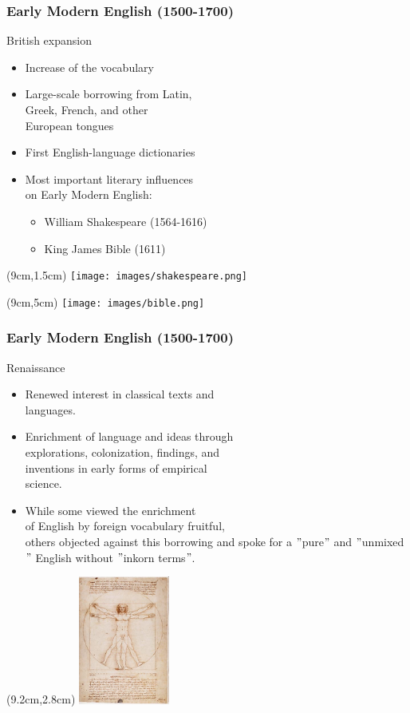 \documentclass[12pt, table]{beamer}
\begin{document}
\begin{frame}
\frametitle{Early Modern English (1500-1700)}
British expansion
\begin{itemize}
\item Increase of the vocabulary
\item Large-scale borrowing from Latin, \\ Greek, French, and other \\ European tongues 
\item First English-language dictionaries
\item Most important literary influences \\ on Early Modern English:
\begin{itemize}
\item William Shakespeare (1564-1616)  
\item King James Bible (1611)
\end{itemize}
\end{itemize}
\begin{textblock*}{10cm}(9cm,1.5cm)
\texttt{[image: images/shakespeare.png]}
\end{textblock*}
\begin{textblock*}{10cm}(9cm,5cm)
\texttt{[image: images/bible.png]}
\end{textblock*}
\end{frame}

\begin{frame}
\frametitle{Early Modern English (1500-1700)}
Renaissance
\begin{itemize}
\item Renewed interest in classical texts and \\ languages.
\item Enrichment of language and ideas through \\ explorations, colonization, findings, and \\ inventions in early forms of empirical \\ science.
\item While some viewed the enrichment \\ of English by foreign vocabulary fruitful, \\ others objected against this borrowing and spoke for a $"$pure$"$ and $"$unmixed$"$ English without $"$inkorn terms$"$.
\end{itemize}
\begin{textblock*}{10cm}(9.2cm,2.8cm)
\includegraphics[width=3cm]{images/davinci.png}
\end{textblock*}
\end{frame}
\end{document}
